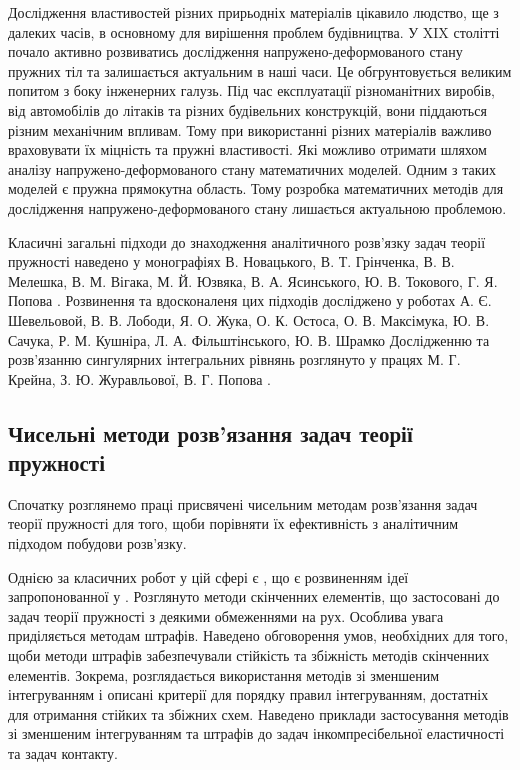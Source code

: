 
Дослідження властивостей різних прирьодніх матеріалів цікавило людство, ще з далеких часів,
в основному для вирішення проблем будівництва.
У XIX столітті почало активно розвиватись дослідження напружено-деформованого стану пружних тіл та залишається актуальним в наші часи.
Це обгрунтовується великим попитом з боку інженерних галузь.
Під час експлуатації різноманітних виробів, від автомобілів до літаків та різних будівельних конструкцій, вони піддаються різним механічним впливам.
Тому при використанні різних матеріалів важливо враховувати їх міцність та пружні властивості.
Які можливо отримати шляхом аналізу напружено-деформованого стану математичних моделей.
Одним з таких моделей є пружна прямокутна область.
Тому розробка математичних методів для дослідження напружено-деформованого стану лишається актуальною проблемою.

Класичні загальні підходи до знаходження аналітичного розв'язку задач теорії пружності наведено у монографіях
В. Новацького, В. Т. Грінченка, В. В. Мелешка, В. М. Вігака, М. Й. Юзвяка, В. А. Ясинського, Ю. В. Токового, Г. Я. Попова \cite{novacki_1, meleshko_1, vihak_1, vihak_2, popov_1}.
Розвинення та вдосконаленя цих підходів досліджено у роботах А. Є. Шевельовой, В. В. Лободи, Я. О. Жука, О. К. Остоса, О. В. Максімука, Ю. В. Сачука, Р. М. Кушніра, Л. А. Фільштінського, Ю. В. Шрамко \cite{loboda_1,maksymuk_1, kushnir_1, filshtin_1}
Дослідженню та розв'язанню сингулярних інтегральних рівнянь розглянуто у працях М. Г. Крейна, З. Ю. Журавльової, В. Г. Попова \cite{kreyn_1, zhuravleva_1,popov_v_1}.

\subsection{Чисельні методи розв'язання задач теорії пружності}
Спочатку розглянемо праці присвячені чисельним методам розв'язання задач теорії пружності
для того, щоби порівняти їх ефективність з аналітичним підходом побудови розв'язку.

Однією за класичних робот у цій сфері є \cite{oden_1}, що є розвиненням ідеї запропонованної у \cite{babushka_1}.
Розглянуто методи скінченних елементів, що застосовані до задач теорії пружності з деякими обмеженнями на рух.
Особлива увага приділяється методам штрафів.
Наведено обговорення умов, необхідних для того, щоби методи штрафів забезпечували стійкість та збіжність методів скінченних елементів.
Зокрема, розглядається використання методів зі зменшеним інтегруванням і описані критерії для порядку правил інтегруванням, достатніх для отримання стійких та збіжних схем.
Наведено приклади застосування методів зі зменшеним інтегруванням та штрафів до задач інкомпресібельної еластичності та задач контакту.

